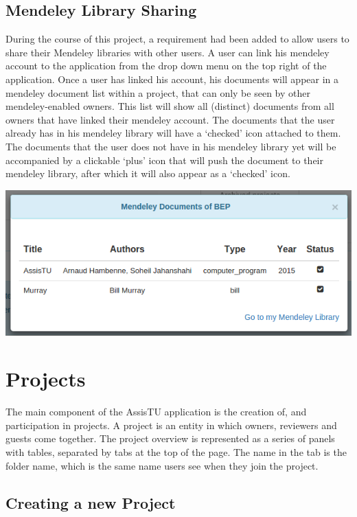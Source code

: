 \newpage

\subsection{Mendeley Library Sharing}

During the course of this project, a requirement had been added to allow users to share their Mendeley libraries with other users. A user can
link his mendeley account to the application from the drop down menu on the top right of the application. Once a user has linked his account,
his documents will appear in a mendeley document list within a project, that can only be seen by other mendeley-enabled owners. This list will show
all (distinct) documents from all owners that have linked their mendeley account. The documents that the user already has in his mendeley library
will have a `checked' icon attached to them. The documents that the user does not have in his mendeley library yet will be accompanied by a clickable 
`plus' icon that will push the document to their mendeley library, after which it will also appear as a `checked' icon.

\begin{center}
\includegraphics[scale=0.5]{./img/mendeley.png}
\end{center}

\section{Projects}

The main component of the AssisTU application is the creation of, and participation in projects. A project is an entity in which owners, reviewers and 
guests come together. 
The project overview is represented as a series of panels with tables, separated by tabs at the top of the page. The name in the tab is the folder 
name, which is the same name users see when they join the project. 

\subsection{Creating a new Project}

